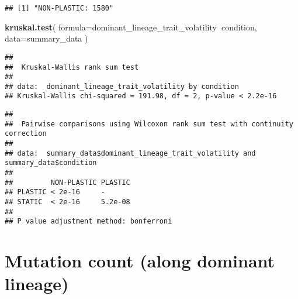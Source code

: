 \documentclass[]{book}
\newenvironment{Shaded}{\begin{snugshade}}{\end{snugshade}}
\newcommand{\DataTypeTok}[1]{\textcolor[rgb]{0.13,0.29,0.53}{#1}}
\newcommand{\KeywordTok}[1]{\textcolor[rgb]{0.13,0.29,0.53}{\textbf{#1}}}
\newcommand{\NormalTok}[1]{#1}
\newcommand{\OperatorTok}[1]{\textcolor[rgb]{0.81,0.36,0.00}{\textbf{#1}}}
\newcommand{\StringTok}[1]{\textcolor[rgb]{0.31,0.60,0.02}{#1}}
\begin{document}
\begin{verbatim}
## [1] "NON-PLASTIC: 1580"
\end{verbatim}

\begin{Shaded}
\begin{Highlighting}[]
\KeywordTok{kruskal.test}\NormalTok{(}
  \DataTypeTok{formula=}\NormalTok{dominant_lineage_trait_volatility}\OperatorTok{~}\NormalTok{condition,}
  \DataTypeTok{data=}\NormalTok{summary_data}
\NormalTok{)}
\end{Highlighting}
\end{Shaded}

\begin{verbatim}
## 
##  Kruskal-Wallis rank sum test
## 
## data:  dominant_lineage_trait_volatility by condition
## Kruskal-Wallis chi-squared = 191.98, df = 2, p-value < 2.2e-16
\end{verbatim}

\begin{Shaded}
\end{Shaded}

\begin{verbatim}
## 
##  Pairwise comparisons using Wilcoxon rank sum test with continuity correction 
## 
## data:  summary_data$dominant_lineage_trait_volatility and summary_data$condition 
## 
##         NON-PLASTIC PLASTIC
## PLASTIC < 2e-16     -      
## STATIC  < 2e-16     5.2e-08
## 
## P value adjustment method: bonferroni
\end{verbatim}

\hypertarget{mutation-count-along-dominant-lineage}{%
\section{Mutation count (along dominant lineage)}\label{mutation-count-along-dominant-lineage}}
\end{document}
